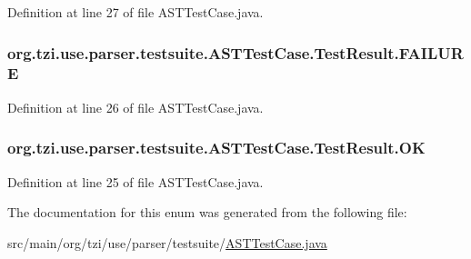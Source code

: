 Definition at line 27 of file A\-S\-T\-Test\-Case.\-java.

\hypertarget{enumorg_1_1tzi_1_1use_1_1parser_1_1testsuite_1_1_a_s_t_test_case_1_1_test_result_a8f890ef6428dd20d724fb084b8dde4b8}{
\subsubsection[{F\-A\-I\-L\-U\-R\-E}]{\setlength{\rightskip}{0pt plus 5cm}org.\-tzi.\-use.\-parser.\-testsuite.\-A\-S\-T\-Test\-Case.\-Test\-Result.\-F\-A\-I\-L\-U\-R\-E}}\label{enumorg_1_1tzi_1_1use_1_1parser_1_1testsuite_1_1_a_s_t_test_case_1_1_test_result_a8f890ef6428dd20d724fb084b8dde4b8}


Definition at line 26 of file A\-S\-T\-Test\-Case.\-java.

\hypertarget{enumorg_1_1tzi_1_1use_1_1parser_1_1testsuite_1_1_a_s_t_test_case_1_1_test_result_a2ef0c3f8667fb610ed48e7955663069a}{
\subsubsection[{O\-K}]{\setlength{\rightskip}{0pt plus 5cm}org.\-tzi.\-use.\-parser.\-testsuite.\-A\-S\-T\-Test\-Case.\-Test\-Result.\-O\-K}}\label{enumorg_1_1tzi_1_1use_1_1parser_1_1testsuite_1_1_a_s_t_test_case_1_1_test_result_a2ef0c3f8667fb610ed48e7955663069a}


Definition at line 25 of file A\-S\-T\-Test\-Case.\-java.



The documentation for this enum was generated from the following file\-:\begin{DoxyCompactItemize}
\item 
src/main/org/tzi/use/parser/testsuite/\hyperlink{_a_s_t_test_case_8java}{A\-S\-T\-Test\-Case.\-java}\end{DoxyCompactItemize}
